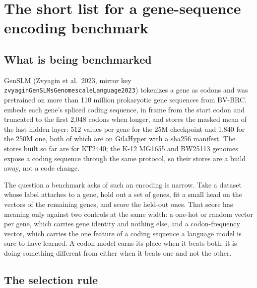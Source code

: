 
\section{The short list for a gene-sequence encoding benchmark}\label{sec:benchmark}

\subsection{What is being benchmarked}

GenSLM (Zvyagin et al.\ 2023, mirror key \texttt{zvyaginGenSLMsGenomescaleLanguage2023})
tokenizes a gene as codons and was pretrained on more than 110 million prokaryotic gene
sequences from BV-BRC.  embeds each gene's spliced
coding sequence, in frame from the start codon and truncated to the first 2,048 codons
when longer, and stores the masked mean of the last hidden layer: 512 values per gene
for the 25M checkpoint and 1,840 for the 250M one, both of which are on GilaHyper with
a sha256 manifest. The stores built so far are for  KT2440; the
 K-12 MG1655 and BW25113 genomes expose a coding sequence through the same
protocol, so their stores are a build away, not a code change.

The question a benchmark asks of such an encoding is narrow. Take a dataset whose label
attaches to a gene, hold out a set of genes, fit a small head on the vectors of the
remaining genes, and score the held-out ones. That score has meaning only against two
controls at the same width: a one-hot or random vector per gene, which carries gene
identity and nothing else, and a codon-frequency vector, which carries the one feature
of a coding sequence a language model is sure to have learned. A codon model earns its
place when it beats both; it is doing something different from either when it beats
one and not the other.

\subsection{The selection rule}

